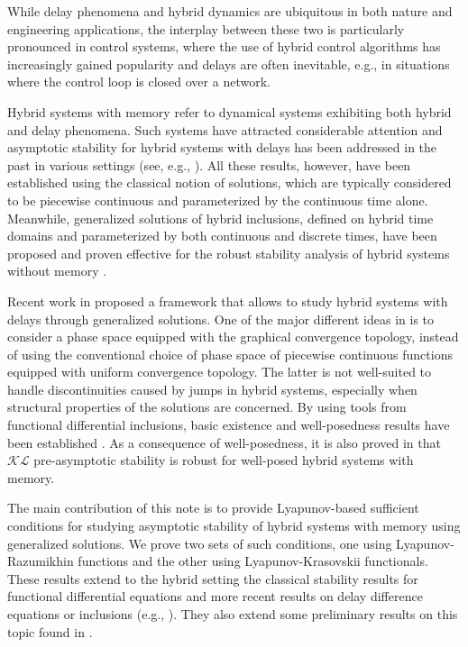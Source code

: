 \documentclass[journal,final,twocolumn]{IEEEtran}
\theoremstyle{definition}
\begin{document}
While delay phenomena and hybrid dynamics are ubiquitous in both nature and engineering applications, the interplay between these two is particularly pronounced in control systems, where the use of hybrid control algorithms has increasingly gained popularity and delays are often inevitable, e.g., in situations where the control loop is closed over a network.

Hybrid systems with memory refer to dynamical systems exhibiting both hybrid and delay phenomena. Such systems have attracted considerable attention and asymptotic stability for hybrid systems with delays has been addressed in the past in various settings (see, e.g., \cite{chen2009input,liu2001uniform,liu2006stability,liu2011generalized,liu2011input,yan2008stability,yuan2003uniform}). All these results, however, have been established using the classical notion of solutions, which are typically considered to be piecewise continuous and parameterized by the continuous time alone. Meanwhile, generalized solutions of hybrid inclusions, defined on hybrid time domains and parameterized by both continuous and discrete times, have been proposed and proven effective for the robust stability analysis of hybrid systems without memory \cite{goebel2004hybrid,goebel2012hybrid,sanfelice2008generalized}.

Recent work in \cite{liu2012generalized,liu2014hybrid-ifac} proposed a framework that allows to study hybrid systems with delays through generalized solutions. One of the major different ideas in \cite{liu2012generalized,liu2014hybrid-ifac} is to consider a phase space equipped with  the graphical convergence topology, instead of using the conventional choice of phase space of piecewise continuous functions equipped with uniform convergence topology. The latter is not well-suited to handle discontinuities caused by jumps in hybrid systems, especially when structural properties of the solutions are concerned. By using tools from functional differential inclusions, basic existence and well-posedness results have been established \cite{liu2014hybrid-siam}. As a consequence of well-posedness, it is also proved in \cite{liu2014hybrid-siam} that ${\mathcal{KL}}$ pre-asymptotic stability is robust for well-posed hybrid systems with memory.

The main contribution of this note is to provide Lyapunov-based sufficient conditions for studying asymptotic stability of hybrid systems with memory using generalized solutions. We prove two sets of such conditions, one using Lyapunov-Razumikhin functions and the other using Lyapunov-Krasovskii functionals. These results extend to the hybrid setting the classical stability results for functional differential equations \cite{hale1993introduction} and more recent results on delay difference equations or inclusions (e.g., \cite{liu2007razumikhin,gielen2013tractable,gielen2013necessary}). They also extend some preliminary results on this topic found in \cite{liu2014hybrid-ifac}.
\end{document}
